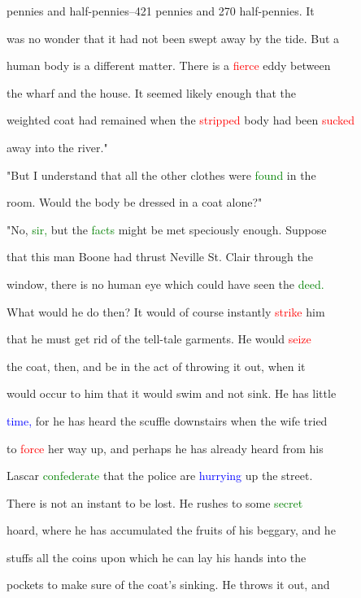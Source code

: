  pennies and half-pennies--421 pennies and 270 half-pennies. It

 was no wonder that it had not been swept away by the tide. But a

 human body is a different matter. There is a \textcolor{red}{fierce} eddy between

 the wharf and the house. It seemed likely enough that the

 \textcolor{BurntOrange}{weighted} coat had remained when the \textcolor{red}{stripped} body had been \textcolor{red}{sucked}

 away into the river."



 "But I understand that all the other clothes were \textcolor{green}{found} in the

 room. Would the body be dressed in a coat alone?"



 "No, \textcolor{green}{sir,} but the \textcolor{green}{facts} might be met speciously enough. Suppose

 that this man Boone had thrust Neville St. Clair through the

 window, there is no human eye which could have seen the \textcolor{green}{deed.}

 What would he do then? It would of course instantly \textcolor{red}{strike} him

 that he must get rid of the tell-tale garments. He would \textcolor{red}{seize}

 the coat, then, and be in the act of throwing it out, when it

 would occur to him that it would \textcolor{BurntOrange}{swim} and not sink. He has little

 \textcolor{blue}{time,} for he has heard the scuffle downstairs when the wife tried

 to \textcolor{red}{force} her way up, and perhaps he has already heard from his

 Lascar \textcolor{green}{confederate} that the \textcolor{BurntOrange}{police} are \textcolor{blue}{hurrying} up the street.

 There is not an instant to be \textcolor{BurntOrange}{lost.} He rushes to some \textcolor{green}{secret}

 hoard, where he has accumulated the fruits of his beggary, and he

 stuffs all the coins upon which he can lay his hands into the

 pockets to make sure of the coat's sinking. He throws it out, and

